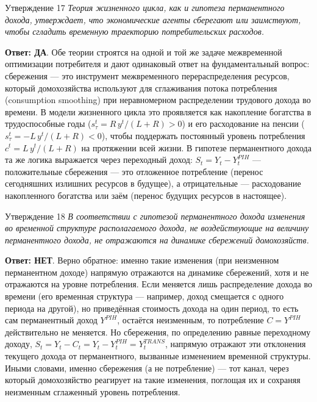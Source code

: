 \documentclass[10pt,a4paper]{article}
\newcommand{\qda}{\textbf{\color{yesgreen}Ответ: ДА}}
\newcommand{\qnet}{\textbf{\color{nored}Ответ: НЕТ}}
\newenvironment{answer}[2]{%
  \begin{qbox}{Утверждение #1}
  \textit{#2}\par\smallskip
}{%
  \end{qbox}\vspace{2pt}
}
\begin{document}
\begin{answer}{17}{Теория жизненного цикла, как и гипотеза перманентного дохода, утверждает, что экономические агенты сберегают или заимствуют, чтобы сгладить временную траекторию потребительских расходов.}
\qda. Обе теории строятся на одной и той же задаче межвременной оптимизации потребителя и дают одинаковый ответ на фундаментальный вопрос: сбережения — это инструмент межвременного перераспределения ресурсов, который домохозяйства используют для сглаживания потока потребления (consumption smoothing) при неравномерном распределении трудового дохода во времени. В модели жизненного цикла это проявляется как накопление богатства в трудоспособные годы ($s^t_\tau=R\,y^t/(L+R)>0$) и его расходование на пенсии ($s^t_\tau=-L\,y^t/(L+R)<0$), чтобы поддержать постоянный уровень потребления $c^t=L\,y^t/(L+R)$ на протяжении всей жизни. В гипотезе перманентного дохода та же логика выражается через переходный доход: $S_t=Y_t-Y^{PIH}_t$ — положительные сбережения — это отложенное потребление (перенос сегодняшних излишних ресурсов в будущее), а отрицательные — расходование накопленного богатства или заём (перенос будущих ресурсов в настоящее).
\end{answer}
 
\begin{answer}{18}{В соответствии с гипотезой перманентного дохода изменения во временной структуре располагаемого дохода, не воздействующие на величину перманентного дохода, не отражаются на динамике сбережений домохозяйств.}
\qnet. Верно обратное: именно такие изменения (при неизменном перманентном доходе) напрямую отражаются на динамике сбережений, хотя и не отражаются на уровне потребления. Если меняется лишь распределение дохода во времени (его временная структура — например, доход смещается с одного периода на другой), но приведённая стоимость дохода на один период, то есть сам перманентный доход $Y^{PIH}$, остаётся неизменным, то потребление $C=Y^{PIH}$ действительно не меняется. Но сбережения, по определению равные переходному доходу, $S_t=Y_t-C_t=Y_t-Y^{PIH}_t=Y^{TRANS}_t$, напрямую отражают эти отклонения текущего дохода от перманентного, вызванные изменением временной структуры. Иными словами, именно сбережения (а не потребление) — тот канал, через который домохозяйство реагирует на такие изменения, поглощая их и сохраняя неизменным сглаженный уровень потребления.
\end{answer}
 
\end{document}
